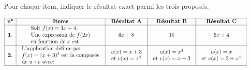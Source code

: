 \begin{exercice}
Pour chaque item, indiquer le  résultat exact parmi les trois proposés.

\medskip

$$\begin{array}{|c|c|c|c|c|}
\hline
\textbf{n°} & \textbf{Items} & \textbf{Résultat A} & \textbf{Résultat B} & \textbf{Résultat C} \\
\hline
\textbf{1.} & \begin{array}{l} \text{Soit } f(x) = 3x + 4. \\ \text{Une expression de } f(2x) \\ \text{en fonction de } x \text{ est} \end{array} & 6x+8 & 10 & 6x+4 \\
\hline
\textbf{2.} & \begin{array}{l} \text{L'application définie par } \\ f(x)=(x+3)^4 \text{ est la composée} \\ \text{de } u \circ v \text{ avec:} \end{array} & \begin{array}{c} u(x)= x+3 \\ \text{et } v(x)=x^4 \end{array} & \begin{array}{c} u(x)= x^4 \\ \text{et } v(x)= x+3 \end{array} & \begin{array}{c} u(x)= x \\ \text{et } v(x)=3+x^4 \end{array} \\
\hline
\end{array}$$

\end{exercice}


